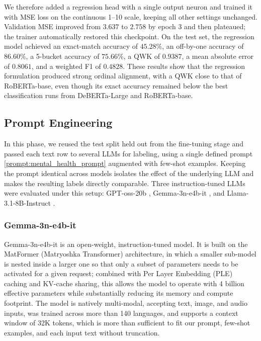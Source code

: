 \documentclass[conference]{IEEEtran}
\begin{document}
We therefore added a regression head with a single output neuron and trained it with MSE loss on the continuous 1--10 scale, keeping all other settings unchanged. Validation MSE improved from $3.637$ to $2.758$ by epoch 3 and then plateaued; the trainer automatically restored this checkpoint. On the test set, the regression model achieved an exact-match accuracy of $45.28\%$, an off-by-one accuracy of $86.60\%$, a 5-bucket accuracy of $75.66\%$, a QWK of $0.9387$, a mean absolute error of $0.8061$, and a weighted F1 of $0.4828$. These results show that the regression formulation produced strong ordinal alignment, with a QWK close to that of RoBERTa-base, even though its exact accuracy remained below the best classification runs from DeBERTa-Large and RoBERTa-base.



\subsection{Prompt Engineering}
In this phase, we reused the test split held out from the fine-tuning stage and passed each text row to several LLMs for labeling, using a single defined prompt \ref{prompt:mental_health_prompt} augmented with few-shot examples. Keeping the prompt identical across models isolates the effect of the underlying LLM and makes the resulting labels directly comparable. Three instruction-tuned LLMs were evaluated under this setup: GPT-oss-20b \cite{openai2025gptoss}, Gemma-3n-e4b-it \cite{google2025gemma3n}, and Llama-3.1-8B-Instruct \cite{meta2025llama31}.


\subsubsection{Gemma-3n-e4b-it}
Gemma-3n-e4b-it \cite{google2025gemma3n} is an open-weight, instruction-tuned
model. It is built on the MatFormer (Matryoshka Transformer) architecture, in which a smaller sub-model is nested inside a larger one so that only a subset of parameters needs to be activated for a given request; combined with Per Layer Embedding (PLE) caching and KV-cache sharing, this allows the model to operate with 4 billion effective parameters while substantially reducing its memory and compute footprint. The model is natively multi-modal, accepting text, image, and audio inputs, was trained across more than 140 languages, and supports a context window of 32K  tokens, which is more than sufficient to fit our prompt, few-shot examples, and each input text without truncation.
\end{document}
